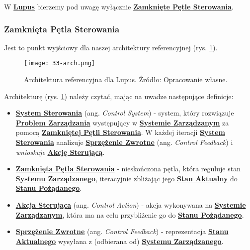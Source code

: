 W \hyperlink{def:lupus}{\textbf{Lupus}} bierzemy pod uwagę wyłącznie \hyperlink{def:zamknieta-petla-sterowania}{\textbf{Zamknięte Pętle Sterowania}}.

\subsubsection{Zamknięta Pętla Sterowania}

Jest to punkt wyjściowy dla naszej architektury referencyjnej (rys. \ref{fig:33-arch}).

\begin{figure}[!h]
    \centering \texttt{[image: 33-arch.png]}
    \caption{Architektura referencyjna dla Lupus. Źródło: Opracowanie własne.}\label{fig:33-arch}
\end{figure}

Architekturę (rys. \ref{fig:33-arch}) należy czytać, mając na uwadze następujące definicje:

\begin{itemize}
    \item \hyperlink{def:system-sterowania}{\textbf{System Sterowania}} (ang. \textit{Control System}) - system, który rozwiązuje \hyperlink{def:problem-zarzadzania}{\textbf{Problem Zarządzania}} występujący w \hyperlink{def:system-zarzadzany}{\textbf{Systemie Zarządzanym}} za pomocą \hyperlink{def:zamknieta-petla-sterowania}{\textbf{Zamkniętej Pętli Sterowania}}. W każdej iteracji \hyperlink{def:system-sterowania}{\textbf{System Sterowania}} analizuje \hyperlink{def:sprzezenie-zwrotne}{\textbf{Sprzężenie Zwrotne}} (ang. \textit{Control Feedback}) i \textit{wnioskuje} \hyperlink{def:akcja-sterujaca}{\textbf{Akcję Sterującą}}.
    \item \hyperlink{def:zamknieta-petla-sterowania}{\textbf{Zamknięta Pętla Sterowania}} - nieskończona pętla, która reguluje stan \hyperlink{def:system-zarzadzany}{\textbf{Systemu Zarządzanego}}, iteracyjnie zbliżając jego \hyperlink{def:stan-aktualny}{\textbf{Stan Aktualny}} do \hyperlink{def:stan-pozadany}{\textbf{Stanu Pożądanego}}. 
    \item \hyperlink{def:akcja-sterujaca}{\textbf{Akcja Sterująca}} (ang. \textit{Control Action}) - akcja wykonywana na \hyperlink{def:system-zarzadzany}{\textbf{Systemie Zarządzanym}}, która ma na celu przybliżenie go do \hyperlink{def:stan-pozadany}{\textbf{Stanu Pożądanego}}.
    \item \hyperlink{def:sprzezenie-zwrotne}{\textbf{Sprzężenie Zwrotne}} (ang. \textit{Control Feedback}) - reprezentacja \hyperlink{def:stan-aktualny}{\textbf{Stanu Aktualnego}} wysyłana z (odbierana od) \hyperlink{def:system-zarzadzany}{\textbf{Systemu Zarządzanego}}.
\end{itemize}

